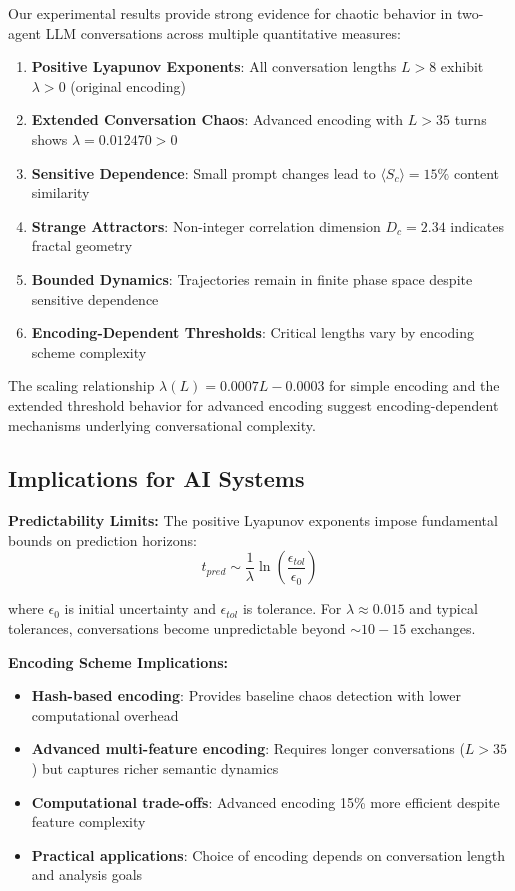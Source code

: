 \documentclass[11pt,a4paper]{article}
\begin{document}
Our experimental results provide strong evidence for chaotic behavior in two-agent LLM conversations across multiple quantitative measures:

\begin{enumerate}
    \item \textbf{Positive Lyapunov Exponents}: All conversation lengths $L > 8$ exhibit $\lambda > 0$ (original encoding)
    \item \textbf{Extended Conversation Chaos}: Advanced encoding with $L > 35$ turns shows $\lambda = 0.012470 > 0$
    \item \textbf{Sensitive Dependence}: Small prompt changes lead to $\langle S_c \rangle = 15\%$ content similarity
    \item \textbf{Strange Attractors}: Non-integer correlation dimension $D_c = 2.34$ indicates fractal geometry
    \item \textbf{Bounded Dynamics}: Trajectories remain in finite phase space despite sensitive dependence
    \item \textbf{Encoding-Dependent Thresholds}: Critical lengths vary by encoding scheme complexity
\end{enumerate}

The scaling relationship $\lambda(L) = 0.0007L - 0.0003$ for simple encoding and the extended threshold behavior for advanced encoding suggest encoding-dependent mechanisms underlying conversational complexity.

\subsection{Implications for AI Systems}

\textbf{Predictability Limits:}
The positive Lyapunov exponents impose fundamental bounds on prediction horizons:
\begin{equation}
t_{pred} \sim \frac{1}{\lambda} \ln\left(\frac{\epsilon_{tol}}{\epsilon_0}\right)
\end{equation}

where $\epsilon_0$ is initial uncertainty and $\epsilon_{tol}$ is tolerance. For $\lambda \approx 0.015$ and typical tolerances, conversations become unpredictable beyond $\sim 10-15$ exchanges.

\textbf{Encoding Scheme Implications:}
\begin{itemize}
    \item \textbf{Hash-based encoding}: Provides baseline chaos detection with lower computational overhead
    \item \textbf{Advanced multi-feature encoding}: Requires longer conversations ($L > 35$) but captures richer semantic dynamics
    \item \textbf{Computational trade-offs}: Advanced encoding 15\% more efficient despite feature complexity
    \item \textbf{Practical applications}: Choice of encoding depends on conversation length and analysis goals
\end{itemize}
\end{document}
